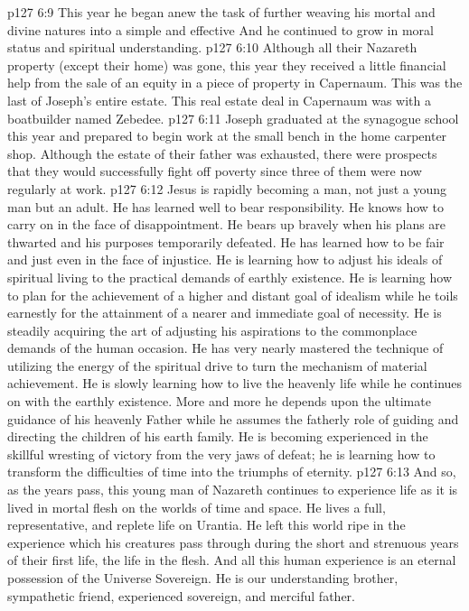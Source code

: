 \vs p127 6:9 This year he began anew the task of further weaving his mortal and divine natures into a simple and effective  And he continued to grow in moral status and spiritual understanding.
\vs p127 6:10 Although all their Nazareth property (except their home) was gone, this year they received a little financial help from the sale of an equity in a piece of property in Capernaum. This was the last of Joseph’s entire estate. This real estate deal in Capernaum was with a boatbuilder named Zebedee.
\vs p127 6:11 Joseph graduated at the synagogue school this year and prepared to begin work at the small bench in the home carpenter shop. Although the estate of their father was exhausted, there were prospects that they would successfully fight off poverty since three of them were now regularly at work.
\vs p127 6:12 \pc Jesus is rapidly becoming a man, not just a young man but an adult. He has learned well to bear responsibility. He knows how to carry on in the face of disappointment. He bears up bravely when his plans are thwarted and his purposes temporarily defeated. He has learned how to be fair and just even in the face of injustice. He is learning how to adjust his ideals of spiritual living to the practical demands of earthly existence. He is learning how to plan for the achievement of a higher and distant goal of idealism while he toils earnestly for the attainment of a nearer and immediate goal of necessity. He is steadily acquiring the art of adjusting his aspirations to the commonplace demands of the human occasion. He has very nearly mastered the technique of utilizing the energy of the spiritual drive to turn the mechanism of material achievement. He is slowly learning how to live the heavenly life while he continues on with the earthly existence. More and more he depends upon the ultimate guidance of his heavenly Father while he assumes the fatherly role of guiding and directing the children of his earth family. He is becoming experienced in the skillful wresting of victory from the very jaws of defeat; he is learning how to transform the difficulties of time into the triumphs of eternity.
\vs p127 6:13 \pc And so, as the years pass, this young man of Nazareth continues to experience life as it is lived in mortal flesh on the worlds of time and space. He lives a full, representative, and replete life on Urantia. He left this world ripe in the experience which his creatures pass through during the short and strenuous years of their first life, the life in the flesh. And all this human experience is an eternal possession of the Universe Sovereign. He is our understanding brother, sympathetic friend, experienced sovereign, and merciful father.
